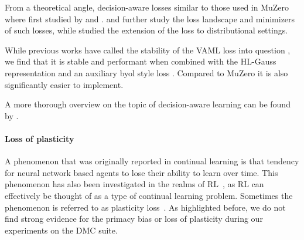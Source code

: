 From a theoretical angle, decision-aware losses similar to those used in MuZero where first studied by \textcite{vaml} and \textcite{itervaml}.
\textcite{grimm2020value} and \textcite{grimm2021proper} further study the loss landscape and minimizers of such losses, while \textcite{kastner2023distributional} studied the extension of the loss to distributional settings.

While previous works have called the stability of the VAML loss into question \textcite{lovatto2020decision,voelcker2022value}, we find that it is stable and performant when combined with the HL-Gauss representation \textcite{farebrother2024stop} and an auxiliary \ac{byol} style loss \textcite{grill2020bootstrap,li2023efficient}.
Compared to MuZero it is also significantly easier to implement.

A more thorough overview on the topic of decision-aware learning can be found by \textcite{wei2024a}.


\paragraph{Loss of plasticity}
A phenomenon that was originally reported in continual learning is that tendency for neural network based agents to lose their ability to learn over time. This phenomenon has also been investigated in the realms of RL~\textcite{igl2021transient}, as RL can effectively be thought of as a type of continual learning problem. Sometimes the phenomenon is referred to as plasticity loss~\textcite{lyle2022understanding, abbas2023loss}. 
As highlighted before, we do not find strong evidence for the primacy bias or loss of plasticity during our experiments on the DMC suite. 

